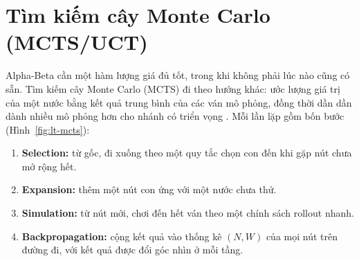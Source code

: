 \section{Tìm kiếm cây Monte Carlo (MCTS/UCT)}
\label{sec:lt-mcts}
Alpha-Beta cần một hàm lượng giá đủ tốt, trong khi không phải lúc nào cũng có sẵn. Tìm kiếm cây Monte Carlo (MCTS) đi theo hướng khác: ước lượng giá trị của một nước bằng kết quả trung bình của các ván mô phỏng, đồng thời dần dần dành nhiều mô phỏng hơn cho nhánh có triển vọng \cite{coulom2006mcts,browne2012mcts}. Mỗi lần lặp gồm bốn bước (Hình~\ref{fig:lt-mcts}):
\begin{enumerate}
  \item \textbf{Selection:} từ gốc, đi xuống theo một quy tắc chọn con đến khi gặp nút chưa mở rộng hết.
  \item \textbf{Expansion:} thêm một nút con ứng với một nước chưa thử.
  \item \textbf{Simulation:} từ nút mới, chơi đến hết ván theo một chính sách rollout nhanh.
  \item \textbf{Backpropagation:} cộng kết quả vào thống kê $(N, W)$ của mọi nút trên đường đi, với kết quả được đổi góc nhìn ở mỗi tầng.
\end{enumerate}

